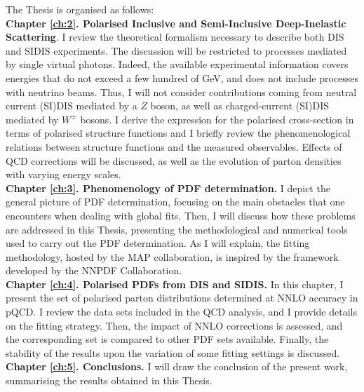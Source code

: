 The Thesis is organised as follows:\\[10pt]
\begingroup
\textbf{Chapter \ref{ch:2}. Polarised Inclusive and Semi-Inclusive Deep-Inelastic Scattering}. I review the theoretical formalism necessary to describe both DIS and SIDIS experiments. The discussion will be restricted to processes mediated by single virtual photons. Indeed, the available experimental information covers energies that do not exceed a few hundred of GeV, and does not include processes with neutrino beams. Thus, I will not consider contributions coming from neutral current (SI)DIS mediated by a $Z$ boson, as well as charged-current (SI)DIS mediated by $W^{\pm}$ bosons. I derive the expression for the polarised cross-section in terms of polarised structure functions and I briefly review the phenomenological relations between structure functions and the measured observables. Effects of QCD corrections will be discussed, as well as the evolution of parton densities with varying energy scales.
\\[5pt]
\textbf{Chapter \ref{ch:3}. Phenomenology of PDF determination.} I depict the general picture of PDF determination, focusing on the main obstacles that one encounters when dealing with global fits. Then, I will discuss how these problems are addressed in this Thesis, presenting the methodological and numerical tools used to carry out the PDF determination. As I will explain, the fitting methodology, hosted by the MAP collaboration, is inspired by the framework developed by the NNPDF Collaboration.
\\[5pt]
\textbf{Chapter \ref{ch:4}. Polarised PDFs from DIS and SIDIS.} In this chapter, I present the set of polarised parton distributions determined at NNLO accuracy in pQCD. I review the data sets included in the QCD analysis, and I provide details on the fitting strategy. Then, the impact of NNLO corrections is assessed, and the corresponding set is compared to other PDF sets available. Finally, the stability of the results upon the variation of some fitting settings is discussed.
\\[5pt]
\textbf{Chapter \ref{ch:5}. Conclusions.} I will draw the conclusion of the present work, summarising the results obtained in this Thesis.
\endgroup